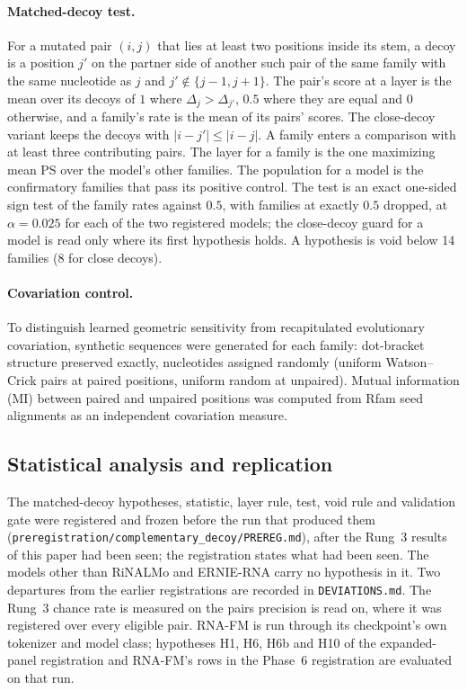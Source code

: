 \documentclass[11pt]{article}
\begin{document}
\paragraph{Matched-decoy test.}
\label{sec:decoy-method}
For a mutated pair $(i, j)$ that lies at least two positions inside its stem,
a decoy is a position $j'$ on the partner side of another such pair of the
same family with the same nucleotide as $j$ and $j' \notin \{j-1, j+1\}$. The
pair's score at a layer is the mean over its decoys of $1$ where
$\Delta_j > \Delta_{j'}$, $0.5$ where they are equal and $0$ otherwise, and a
family's rate is the mean of its pairs' scores. The close-decoy variant keeps
the decoys with $|i - j'| \leq |i - j|$. A family enters a comparison with at
least three contributing pairs. The layer for a family is the one maximizing
mean PS over the model's other families. The population for a model is the
confirmatory families that pass its positive control. The test is an exact
one-sided sign test of the family rates against $0.5$, with families at exactly
$0.5$ dropped, at $\alpha = 0.025$ for each of the two registered models; the
close-decoy guard for a model is read only where its first hypothesis holds. A
hypothesis is void below 14 families (8 for close decoys).

\paragraph{Covariation control.}
To distinguish learned geometric sensitivity from recapitulated evolutionary
covariation, synthetic sequences were generated for each family: dot-bracket
structure preserved exactly, nucleotides assigned randomly (uniform
Watson--Crick pairs at paired positions, uniform random at unpaired). Mutual
information (MI) between paired and unpaired positions was computed from Rfam
seed alignments as an independent covariation measure.

\subsection{Statistical analysis and replication}
\label{sec:stats}

The matched-decoy hypotheses, statistic, layer rule, test, void rule and
validation gate were registered and frozen before the run that produced them
(\texttt{preregistration/complementary\_decoy/PREREG.md}), after the Rung~3
results of this paper had been seen; the registration states what had been
seen. The models other than RiNALMo and ERNIE-RNA carry no hypothesis in it.
Two departures from the earlier registrations are recorded in
\texttt{DEVIATIONS.md}. The Rung~3 chance rate is measured on the pairs
precision is read on, where it was registered over every eligible pair. RNA-FM
is run through its checkpoint's own tokenizer and model class; hypotheses H1,
H6, H6b and H10 of the expanded-panel registration and RNA-FM's rows in the
Phase~6 registration are evaluated on that run.
\end{document}
